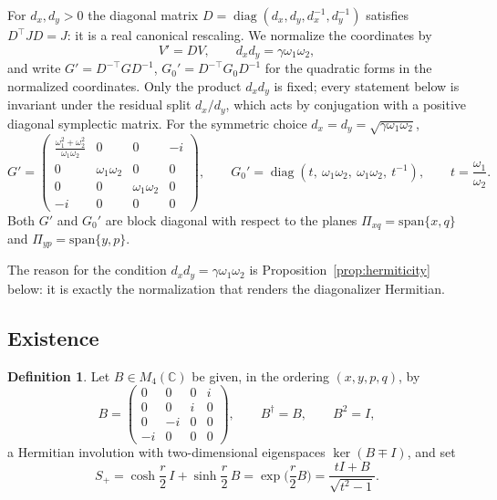 \documentclass[11pt]{article}
\theoremstyle{definition}
\newtheorem{definition}[theorem]{Definition}
\theoremstyle{remark}
\newcommand{\C}{\mathbb{C}}
\newcommand{\w}{\omega}
\newcommand{\diag}{\operatorname{diag}}
\newcommand{\dg}{\dagger}
\begin{document}
For $d_x,d_y>0$ the diagonal matrix
$D=\diag(d_x,d_y,d_x^{-1},d_y^{-1})$ satisfies $D^{\top}JD=J$: it is a real
canonical rescaling.  We normalize the coordinates by
\begin{equation}\label{eq:normalization}
V'=DV,\qquad d_xd_y=\gamma\w_1\w_2,
\end{equation}
and write $G'=D^{-\top}GD^{-1}$, $G_0'=D^{-\top}G_0D^{-1}$ for the quadratic
forms in the normalized coordinates.  Only the product $d_xd_y$ is fixed;
every statement below is invariant under the residual split
$d_x/d_y$, which acts by conjugation with a positive diagonal symplectic
matrix.  For the symmetric choice $d_x=d_y=\sqrt{\gamma\w_1\w_2}$,
\begin{equation}\label{eq:Gprime}
G'=\begin{pmatrix}
\frac{\w_1^2+\w_2^2}{\w_1\w_2}&0&0&-i\\[2pt]
0&\w_1\w_2&0&0\\
0&0&\w_1\w_2&0\\
-i&0&0&0
\end{pmatrix},
\qquad
G_0'=\diag\!\left(t,\ \w_1\w_2,\ \w_1\w_2,\ t^{-1}\right),
\qquad t=\frac{\w_1}{\w_2} .
\end{equation}
Both $G'$ and $G_0'$ are block diagonal with respect to the planes
$\Pi_{xq}=\mathrm{span}\{x,q\}$ and $\Pi_{yp}=\mathrm{span}\{y,p\}$.

The reason for the condition $d_xd_y=\gamma\w_1\w_2$ is
Proposition~\ref{prop:hermiticity} below: it is exactly the normalization
that renders the diagonalizer Hermitian.

\subsection{Existence}

\begin{definition}\label{def:B}
Let $B\in M_4(\C)$ be given, in the ordering $(x,y,p,q)$, by
\begin{equation}
B=\begin{pmatrix}0&0&0&i\\0&0&i&0\\0&-i&0&0\\-i&0&0&0\end{pmatrix},
\qquad B^{\dg}=B,\qquad B^2=I,
\end{equation}
a Hermitian involution with two-dimensional eigenspaces
$\ker(B\mp I)$, and set
\begin{equation}\label{eq:Splus}
S_+=\cosh\frac r2\, I+\sinh\frac r2\, B
=\exp\!\Big(\frac r2 B\Big)
=\frac{tI+B}{\sqrt{t^2-1}} .
\end{equation}
\end{definition}
\end{document}
